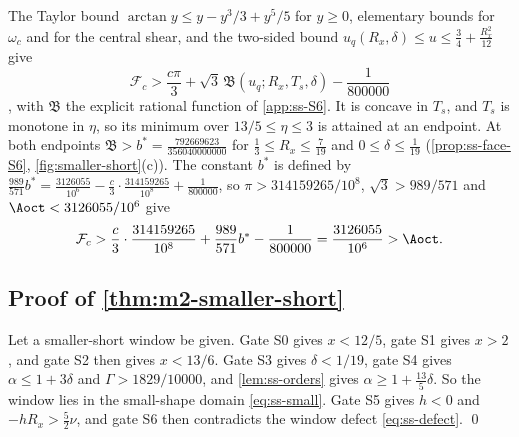  The Taylor bound $\arctan y\le y-y^3/3+y^5/5$ for $y\ge0$,
elementary bounds for $\omega_c$ and for the central shear, and the two-sided bound
$u_q(R_x,\delta)\le u\le\frac34+\frac{R_x^2}{12}$ give
\[
  \mathcal F_c>\frac{c\pi}{3}+\sqrt3\,\mathfrak B(u_q;R_x,T_s,\delta)-\frac1{800000}
\], with $\mathfrak B$ the explicit rational function of \cref{app:ss-S6}. It is
concave in $T_s$, and $T_s$ is monotone in $\eta$, so its minimum over $13/5\le\eta\le3$ is
attained at an endpoint. At both endpoints
$\mathfrak B>b^*=\frac{792669623}{356040000000}$ for $\frac13\le R_x\le\frac7{19}$ and
$0\le\delta\le\frac1{19}$ (\cref{prop:ss-face-S6}, \cref{fig:smaller-short}(c)). The constant
$b^*$ is defined by $\frac{989}{571}b^*=\frac{3126055}{10^6}-\frac{c}{3}\cdot
\frac{314159265}{10^8}+\frac{1}{800000}$, so $\pi>314159265/10^8$, $\sqrt3>989/571$ and
$\Aoct<3126055/10^6$ give
\[
  \mathcal F_c>\frac{c}{3}\cdot\frac{314159265}{10^8}+\frac{989}{571}b^*-\frac1{800000}
  =\frac{3126055}{10^6}>\Aoct.
\]


\subsection{Proof of \texorpdfstring{\cref{thm:m2-smaller-short}}{the theorem}}\label{sec:ss-assembly}

Let a smaller-short window be given. Gate S0 gives $x<12/5$, gate S1 gives $x>2$, and gate S2
then gives $x<13/6$. Gate S3 gives $\delta<1/19$, gate S4 gives $\alpha\le1+3\delta$ and
$\Gamma>1829/10000$, and \cref{lem:ss-orders} gives $\alpha\ge1+\frac{13}{5}\delta$. So the
window lies in the small-shape domain \eqref{eq:ss-small}. Gate S5 gives $h<0$ and
$-hR_x>\frac52\nu$, and gate S6 then contradicts the window defect \eqref{eq:ss-defect}. \qed
